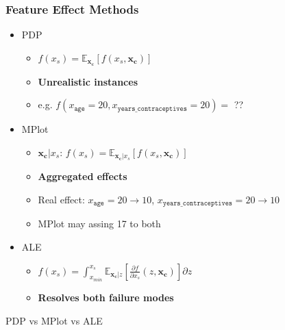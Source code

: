 \documentclass{beamer}
\begin{document}
\begin{frame}
  \frametitle{Feature Effect Methods}

  \begin{itemize}
  \item<1-> PDP~\citep{Friedman2001}
    \begin{itemize}
    \item \(f(x_s) = \mathbb{E}_{\bm{x_c}}[f(x_s, \bm{x_c})]\)
    \item \textbf{Unrealistic instances}
    \item e.g. \(f(x_{\mathtt{age}} = 20, x_{\mathtt{years\_contraceptives}} = 20) = \) ??
    \end{itemize}

  \item<2-> MPlot~\citep{Apley2020}
    \begin{itemize}
    \item \(\bm{x_c}|x_s\): \(f(x_s) = \mathbb{E}_{\bm{x_c}|x_s}[f(x_s, \bm{x_c})]\)
    \item \textbf{Aggregated effects}
    \item Real effect: \(x_{\mathtt{age}} = 20 \rightarrow 10\), \(x_{\mathtt{years\_contraceptives}} = 20 \rightarrow 10\)
    \item MPlot may assing 17 to both
    \end{itemize}

  \item<3-> ALE\citep{Apley2020}
    \begin{itemize}
    \item \(f(x_s) = \int_{x_{min}}^{x_s}\mathbb{E}_{\bm{x_c}|z}[ \frac{\partial f}{\partial x_s}(z, \bm{x_c})] \partial z\)
    \item \textbf{Resolves both failure modes}
    \end{itemize}

  \end{itemize}
  \noindent\makebox[\linewidth]{\rule{\paperwidth}{0.4pt}}
  PDP vs MPlot vs ALE
\end{frame}
\end{document}
